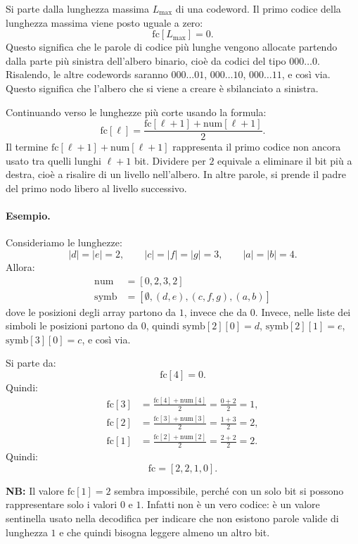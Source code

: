 \documentclass{article}
\theoremstyle{definition}
\numberwithin{equation}{section}
\begin{document}
Si parte dalla lunghezza massima $L_{\max}$ di una codeword. Il primo codice della lunghezza massima viene posto uguale a zero:
\[
    \text{fc}[L_{\max}] = 0.
\]
Questo significa che le parole di codice più lunghe vengono allocate partendo dalla parte più sinistra dell'albero binario, cioè da codici del tipo $000\ldots0$. Risalendo, le altre codewords saranno $000\ldots01$, $000\ldots10$, $000\ldots11$, e così via. Questo significa che l'albero che si viene a creare è sbilanciato a sinistra.

Continuando verso le lunghezze più corte usando la formula:
\[
    \text{fc}[\ell] =
    \frac{\text{fc}[\ell+1]+\text{num}[\ell+1]}{2}.
\]
Il termine $\text{fc}[\ell+1]+\text{num}[\ell+1]$ rappresenta il primo codice non ancora usato tra quelli lunghi $\ell+1$ bit. Dividere per $2$ equivale a eliminare il bit più a destra, cioè a risalire di un livello nell'albero. In altre parole, si prende il padre del primo nodo libero al livello successivo.

\paragraph{Esempio.}
Consideriamo le lunghezze:
\[
    |d|=|e|=2,\qquad
    |c|=|f|=|g|=3,\qquad
    |a|=|b|=4.
\]
Allora:
\begin{align*}
    \text{num}  & =[0,2,3,2]                          \\
    \text{symb} & =[\emptyset, (d,e), (c,f,g), (a,b)]
\end{align*}
dove le posizioni degli array partono da $1$, invece che da $0$. Invece, nelle liste dei simboli le posizioni partono da $0$, quindi $\text{symb}[2][0]=d$, $\text{symb}[2][1]=e$, $\text{symb}[3][0]=c$, e così via.

Si parte da:
\[
    \text{fc}[4]=0.
\]
Quindi:
\begin{align*}
    \text{fc}[3] & = \frac{\text{fc}[4]+\text{num}[4]}{2}
    = \frac{0+2}{2}=1,                                    \\
    \text{fc}[2] & = \frac{\text{fc}[3]+\text{num}[3]}{2}
    = \frac{1+3}{2}=2,                                    \\
    \text{fc}[1] & = \frac{\text{fc}[2]+\text{num}[2]}{2}
    = \frac{2+2}{2}=2.
\end{align*}
Quindi:
\[
    \text{fc}=[2,2,1,0].
\]

\textbf{NB:} Il valore $\text{fc}[1]=2$ sembra impossibile, perché con un solo bit si possono rappresentare solo i valori $0$ e $1$. Infatti non è un vero codice: è un valore sentinella usato nella decodifica per indicare che non esistono parole valide di lunghezza $1$ e che quindi bisogna leggere almeno un altro bit.
\end{document}
